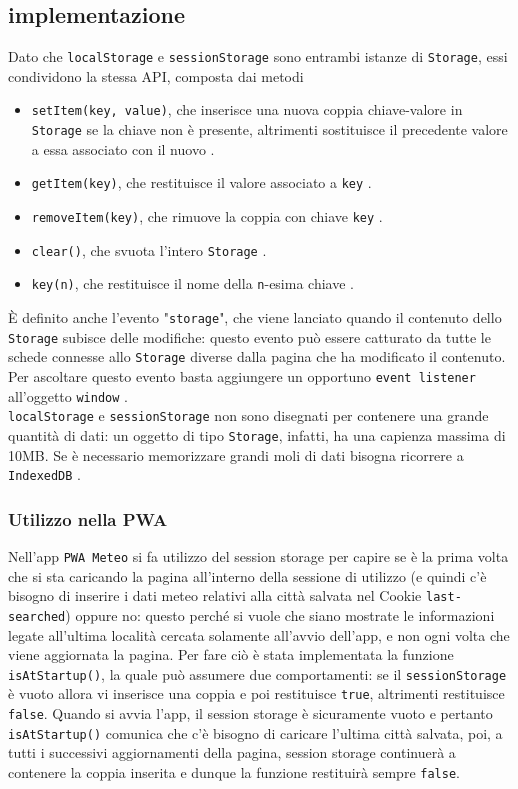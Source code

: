 \documentclass[a4paper, 12pt, twoside, openright]{book}
\begin{document}
\subsection{implementazione}
Dato che \texttt{localStorage} e \texttt{sessionStorage} sono entrambi istanze di \texttt{Storage}, essi condividono la stessa API, composta dai metodi
\begin{itemize}
\item\texttt{setItem(key, value)}, che inserisce una nuova coppia chiave-valore in \texttt{Storage} se la chiave non è presente, altrimenti sostituisce il precedente valore a essa associato con il nuovo \cite{MDN_Web_docs:localStorage}.
\item\texttt{getItem(key)}, che restituisce il valore associato a \texttt{key} \cite{MDN_Web_docs:localStorage}.
\item\texttt{removeItem(key)}, che rimuove la coppia con chiave \texttt{key} \cite{MDN_Web_docs:localStorage}.
\item\texttt{clear()}, che svuota l'intero \texttt{Storage} \cite{MDN_Web_docs:localStorage}.
\item\texttt{key(n)}, che restituisce il nome della \texttt{n}-esima chiave \cite{MDN_Web_docs:localStorage}. 
\end{itemize}
È definito anche l'evento "\texttt{storage}", che viene lanciato quando il contenuto dello \texttt{Storage} subisce delle modifiche: questo evento può essere catturato da tutte le schede connesse allo \texttt{Storage} diverse dalla pagina che ha modificato il contenuto. Per ascoltare questo evento basta aggiungere un opportuno \texttt{event listener} all'oggetto \texttt{window} \cite{MDN_Web_docs:storage_API}.\\
\texttt{localStorage} e \texttt{sessionStorage} non sono disegnati per contenere una grande quantità di dati: un oggetto di tipo \texttt{Storage}, infatti, ha una capienza massima di 10MB. Se è necessario memorizzare grandi moli di dati bisogna ricorrere a \texttt{IndexedDB} \cite{MDN_Web_docs:IndexedDB_basic}.
\subsubsection{Utilizzo nella PWA}
Nell'app \texttt{PWA Meteo} si fa utilizzo del session storage per capire se è la prima volta che si sta caricando la pagina all'interno della sessione di utilizzo (e quindi c'è bisogno di inserire i dati meteo relativi alla città salvata nel Cookie \texttt{last-searched}) oppure no: questo perché si vuole che siano mostrate le informazioni legate all'ultima località cercata solamente all'avvio dell'app, e non ogni volta che viene aggiornata la pagina. Per fare ciò è stata implementata la funzione \texttt{isAtStartup()}, la quale può assumere due comportamenti: se il \texttt{sessionStorage} è vuoto allora vi inserisce una coppia e poi restituisce \texttt{true}, altrimenti restituisce \texttt{false}. Quando si avvia l'app, il session storage è sicuramente vuoto e pertanto \texttt{isAtStartup()} comunica che c'è bisogno di caricare l'ultima città salvata, poi, a tutti i successivi aggiornamenti della pagina, session storage continuerà a contenere la coppia inserita e dunque la funzione restituirà sempre \texttt{false}.
\end{document}
